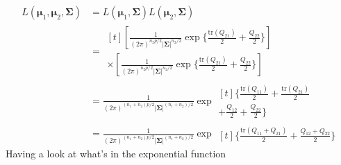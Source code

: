 \begin{align*}
    L(\bm{\mu}_{1}, \bm{\mu}_{2}, \bm{\Sigma})
    & =
    L(\bm{\mu}_{1}, \bm{\Sigma})
    L(\bm{\mu}_{2}, \bm{\Sigma})
    \\
    & =
    \begin{multlined}[t]
    \left[
        \frac{1}{{(2\pi)}^{n_{2}p/2}{|\bm{\Sigma}|}^{n_{2}/2}}
        \exp
        \Bigg\{
            \frac{\text{tr}(Q_{21})}{2}
            +
            \frac{Q_{22}}{2}
        \Bigg\}
    \right] \\
    \times
    \left[
        \frac{1}{{(2\pi)}^{n_{2}p/2}{|\bm{\Sigma}|}^{n_{2}/2}}
        \exp
        \Bigg\{
            \frac{\text{tr}(Q_{21})}{2}
            +
            \frac{Q_{22}}{2}
        \Bigg\}
    \right]
    \end{multlined}
    \\
    & =
    \frac{1}{{(2\pi)}^{(n_{1} + n_{2})p/2}{|\bm{\Sigma}|}^{(n_{1} + n_{2})/2}}
    \exp
    \begin{multlined}[t]
        \Bigg\{
        \frac{\text{tr}(Q_{11})}{2}
        +
        \frac{\text{tr}(Q_{21})}{2} \\
        +
        \frac{Q_{12}}{2}
        +
        \frac{Q_{22}}{2}
        \Bigg\}
    \end{multlined}
    \\
    & =
    \frac{1}{{(2\pi)}^{(n_{1} + n_{2})p/2}{|\bm{\Sigma}|}^{(n_{1} + n_{2})/2}}
    \exp
    \begin{multlined}[t]
        \Bigg\{
        \frac{\text{tr}(Q_{11} + Q_{21})}{2}
        +
        \frac{Q_{12} + Q_{22}}{2}
        \Bigg\}
    \end{multlined}
\end{align*}
Having a look at what's in the exponential function
